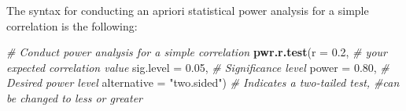 \documentclass[
]{book}
\newenvironment{Shaded}{\begin{snugshade}}{\end{snugshade}}
\newcommand{\AttributeTok}[1]{\textcolor[rgb]{0.13,0.29,0.53}{#1}}
\newcommand{\CommentTok}[1]{\textcolor[rgb]{0.56,0.35,0.01}{\textit{#1}}}
\newcommand{\FloatTok}[1]{\textcolor[rgb]{0.00,0.00,0.81}{#1}}
\newcommand{\FunctionTok}[1]{\textcolor[rgb]{0.13,0.29,0.53}{\textbf{#1}}}
\newcommand{\NormalTok}[1]{#1}
\newcommand{\StringTok}[1]{\textcolor[rgb]{0.31,0.60,0.02}{#1}}
\begin{document}
The syntax for conducting an apriori statistical power analysis for a simple correlation is the following:

\begin{Shaded}
\begin{Highlighting}[]
\CommentTok{\# Conduct power analysis for a simple correlation}
\FunctionTok{pwr.r.test}\NormalTok{(}\AttributeTok{r =} \FloatTok{0.2}\NormalTok{, }\CommentTok{\# your expected correlation value}
           \AttributeTok{sig.level =} \FloatTok{0.05}\NormalTok{, }\CommentTok{\# Significance level}
           \AttributeTok{power =} \FloatTok{0.80}\NormalTok{, }\CommentTok{\# Desired power level}
\AttributeTok{alternative =} \StringTok{"two.sided"}\NormalTok{) }\CommentTok{\# Indicates a two{-}tailed test, \#can be changed to less or greater}
\end{Highlighting}
\end{Shaded}


  
\end{document}
